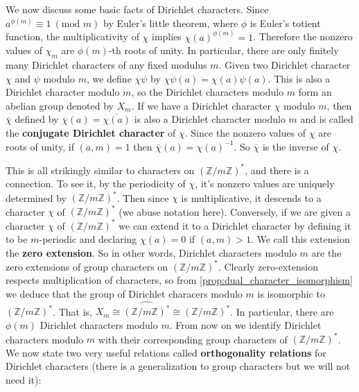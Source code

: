 \documentclass[12pt]{book}
\theoremstyle{definition}\newframedtheorem{method}{Method}
\newcommand{\tmod}[1]{\ \left(\text{mod }#1\right)}
\newcommand{\Z}{\mathbb{Z}}
\newcommand{\<}{\langle}
\renewcommand{\>}{\rangle}
\newcommand{\what}{\widehat}
\newcommand{\conj}{\overline}
\newcommand{\cchi}{\conj{\chi}}
\begin{document}
    We now discuss some basic facts of Dirichlet characters. Since $a^{\phi(m)} \equiv 1 \tmod{m}$  by Euler's little theorem, where $\phi$ is Euler's totient function, the multiplicativity of $\chi$ implies $\chi(a)^{\phi(m)} = 1$. Therefore the nonzero values of $\chi_{m}$ are $\phi(m)$-th roots of unity. In particular, there are only finitely many Dirichlet characters of any fixed modulus $m$. Given two Dirichlet character $\chi$ and $\psi$ modulo $m$, we define $\chi\psi$ by $\chi\psi(a) = \chi(a)\psi(a)$. This is also a Dirichlet character modulo $m$, so the Dirichlet characters modulo $m$ form an abelian group denoted by $X_{m}$. If we have a Dirichlet character $\chi$ modulo $m$, then $\cchi$ defined by $\cchi(a) = \conj{\chi(a)}$ is also a Dirichlet character modulo $m$ and is called the \textbf{conjugate Dirichlet character} of $\chi$. Since the nonzero values of $\chi$ are roots of unity, if $(a,m) = 1$ then $\cchi(a) = \chi(a)^{-1}$. So $\cchi$ is the inverse of $\chi$.

    This is all strikingly similar to characters on $(\Z/m\Z)^{\ast}$, and there is a connection. To see it, by the periodicity of $\chi$, it's nonzero values are uniquely determined by $(\Z/m\Z)^{\ast}$. Then since $\chi$ is multiplicative, it descends to a character $\chi$ of $(\Z/m\Z)^{\ast}$ (we abuse notation here). Conversely, if we are given a character $\chi$ of $(\Z/m\Z)^{\ast}$ we can extend it to a Dirichlet character by defining it to be $m$-periodic and declaring $\chi(a) = 0$ if $(a,m) > 1$. We call this extension the \textbf{zero extension}. So in other words, Dirichlet characters modulo $m$ are the zero extensions of group characters on $(\Z/m\Z)^{\ast}$. Clearly zero-extension respects multiplication of characters, so from \cref{prop:dual_character_isomorphism} we deduce that the group of Dirichlet characers modulo $m$ is isomorphic to $(\Z/m\Z)^{\ast}$. That is, $X_{m} \cong \what{(\Z/m\Z)^{\ast}} \cong (\Z/m\Z)^{\ast}$. In particular, there are $\phi(m)$ Dirichlet characters modulo $m$. From now on we identify Dirichlet characters modulo $m$ with their corresponding group characters of $(\Z/m\Z)^{\ast}$. We now state two very useful relations called \textbf{orthogonality relations} for Dirichlet characters (there is a generalization to group characters but we will not need it):
\end{document}
